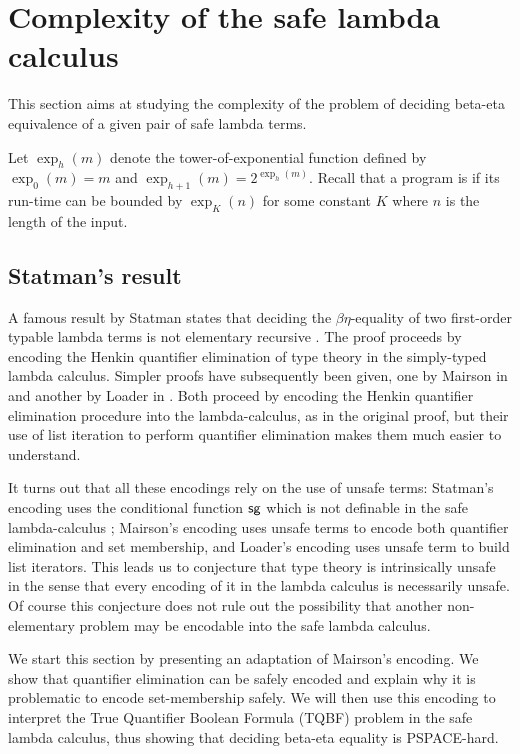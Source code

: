 \newcommand\bigo{\mathcal{O}} %
\newcommand\booltype{\mathsf{B}}
\newcommand\towerexp[2]{\exp_{#1}(#2)}

\section{Complexity of the safe lambda calculus}
This section aims at studying the complexity of the problem of
deciding beta-eta equivalence of a given pair of safe lambda terms.



Let $\towerexp{h}{m}$ denote the tower-of-exponential function
defined by $\towerexp{0}{m} = m$ and $\towerexp{h+1}{m} =
2^{\towerexp{h}{m}}$. Recall that a program is
 if its run-time can be bounded by
$\towerexp{K}{n}$ for some constant $K$ where $n$ is the length of
the input.

\subsection{Statman's result}

A famous result by Statman  states that deciding the
$\beta\eta$-equality of two first-order typable lambda terms is not
elementary recursive \cite{Statman:1979:TLE}. The proof proceeds by
encoding the Henkin quantifier elimination of type theory in the
simply-typed lambda calculus. Simpler proofs have subsequently been
given, one by Mairson in \cite{mairson1992spt} and another by Loader
in \cite{Loader1998}. Both proceed by encoding the Henkin quantifier
elimination procedure into the lambda-calculus, as in the original
proof, but their use of list iteration to perform quantifier
elimination makes them much easier to understand.

It turns out that all these encodings rely on the use of unsafe
terms: Statman's encoding uses the conditional function $\sf sg$
which is not definable in the safe lambda-calculus
\cite{blumong:safelambdacalculus}; Mairson's encoding uses unsafe
terms to encode both quantifier elimination and set membership, and
Loader's encoding uses unsafe term to build list iterators. This
leads us to conjecture that type theory is intrinsically unsafe in
the sense that every encoding of it in the lambda calculus is
necessarily unsafe. Of course this conjecture does not rule out the
possibility that another non-elementary problem may be encodable
into the safe lambda calculus.

We start this section by presenting an adaptation of Mairson's
encoding. We show that quantifier elimination can be safely encoded
and explain why it is problematic to encode set-membership safely.
We will then use this encoding to interpret the True Quantifier
Boolean Formula (TQBF) problem in the safe lambda calculus, thus
showing that deciding beta-eta equality is PSPACE-hard.

